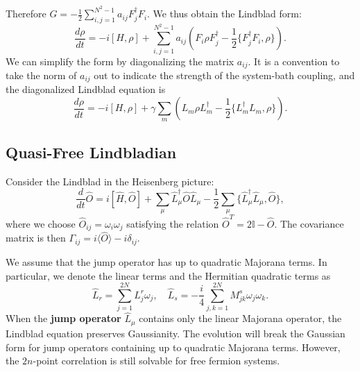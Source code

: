 \documentclass{SciPost}
\begin{document}
Therefore $G = -\frac{1}{2}\sum_{i,j=1}^{N^2-1}a_{ij}F_j^\dagger F_i$. We thus obtain the Lindblad form:
\begin{equation}
	\frac{d\rho}{dt} = -i[H,\rho]+\sum_{i,j=1}^{N^2-1}a_{ij} \left(F_i\rho F_j^\dagger-\frac{1}{2}\{F_j^\dagger F_i, \rho\} \right).
\end{equation}
We can simplify the form by diagonalizing the matrix $a_{ij}$. It is a convention to take the norm of $a_{ij}$ out to indicate the strength of the system-bath coupling, and the diagonalized Lindblad equation is
\begin{equation}\label{eq:lindbladian}
	\frac{d\rho}{dt} = -i[H,\rho]+ \gamma\sum_{m} \left(L_m\rho L_m^\dagger-\frac{1}{2}\{L_m^\dagger L_m, \rho\} \right).
\end{equation}







\subsection{Quasi-Free Lindbladian}
Consider the Lindblad in the Heisenberg picture:
\begin{equation}
	\frac{d}{dt} \hat O
	= i[\hat H, \hat O] + \sum_\mu \hat L_\mu^\dagger \hat O\hat L_\mu - \frac{1}{2} \sum_\mu\{\hat L_\mu^\dagger \hat L_\mu, \hat O \},
\end{equation}
where we choose $\hat O_{ij} = \omega_i\omega_j$ satisfying the relation $\hat O^T = 2\mathbb I - \hat O$. The covariance matrix is then $\Gamma_{ij} = i\langle \hat O\rangle - i\delta_{ij}$.

We assume that the jump operator has up to quadratic Majorana terms. In particular, we denote the linear terms and the Hermitian quadratic terms as
\begin{equation}
	\hat L_r = \sum_{j=1}^{2N} L^r_{j} \omega_j, \quad
	\hat L_s = -\frac{i}{4} \sum_{j,k=1}^{2N} M^s_{jk} \omega_j \omega_k.
\end{equation}
When the \textbf{jump operator} $\hat L_\mu$ contains only the linear Majorana operator, the Lindblad equation preserves Gaussianity. The evolution will break the Gaussian form for jump operators containing up to quadratic Majorana terms. 
However, the $2n$-point correlation is still solvable for free fermion systems.
\end{document}
